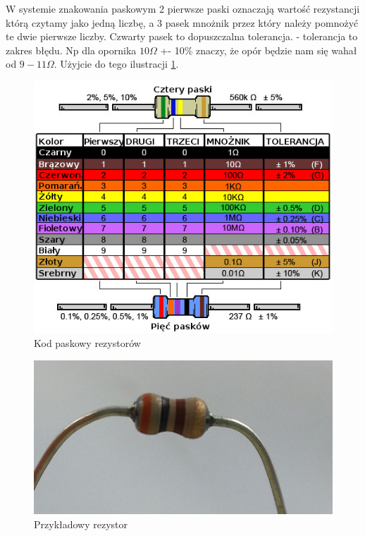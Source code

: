 \documentclass[a4paper,12pt, twoside]{article}
\begin{document}
W systemie znakowania paskowym 2 pierwsze paski oznaczają wartość rezystancji którą czytamy jako jedną liczbę, a 3 pasek mnożnik przez który należy pomnożyć te dwie pierwsze liczby.
Czwarty pasek to dopuszczalna tolerancja. - tolerancja to zakres błędu. Np dla opornika $10\Omega$ +- 10\% znaczy, że opór będzie nam się wahał od $9-11\Omega $. Użyjcie do tego ilustracji \ref{fig:kod}.
\begin{figure}[h]
 \centering
  \includegraphics[scale=0.7]{kod_paskowy.jpg}
  \caption{Kod paskowy rezystorów}
  \label{fig:kod}
\end{figure}
\begin{figure}
 \centering
  \includegraphics[scale=0.4]{opornik.jpg}
  \caption{Przykładowy rezystor}
  \label{fig:rez_zad}
\end{figure}
\FloatBarrier

    
          
\end{document}
